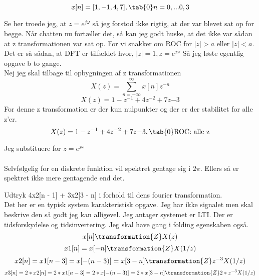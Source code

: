 \begin{rubrik}
\begin{eksamensOpgave}
    \end{eksamensOpgave}
    \clearpage
    \begin{eksamensOpgave}
        \[x[n] = [1, -1, 4, 7], \tab{0} n = 0, ...0, 3\]
        \begin{UnderOpgave}
            \color{teal}Se her troede jeg, at $z = e^{j\omega}$ så jeg forstod ikke rigtig, at der var blevet sat op for begge.
            Når chatten nu fortæller det, så kan jeg godt huske, at det ikke var sådan at z transformationen var sat op. 
            For vi snakker om ROC for $|z| > a$ eller $|z| < a$. Det er så sådan, at DFT er tilfældet hvor, $|z| = 1, z = e^{j\omega}$
            Så jeg løste egentlig opgave b to gange. \\
            Nej jeg skal tilbage til opbygningen af z transformationen\color{black}
            \[X(z)=\sum_{n=-\infty}^{\infty}x[n]z^{-n}\]
            \[X(z) = 1 - z^{-1} + 4z^{-2} + 7z{-3}\]
            For denne z transformation er der kun nulpunkter og der er der stabilitet for alle z'er.\\
            \[X(z) = 1 - z^{-1} + 4z^{-2} + 7z{-3}, \tab{0} \text{ROC: alle z}\]
        \end{UnderOpgave} 
        \begin{UnderOpgave}            
            Jeg substituere for $z = e^{j\omega}$ 
            \\\\
            Selvfølgelig for en diskrete funktion vil spektret gentage sig i $2\pi$. Ellers så er spektret ikke mere gentagende end det.
        \end{UnderOpgave}
        \begin{UnderOpgave}
            Udtryk 4x2[n - 1] + 3x2[3 - n] i forhold til dens fourier transformation. \\
            Det her er en typisk system karakteristisk opgave. Jeg har ikke signalet men skal beskrive den så godt jeg kan alligevel.
            Jeg antager systemet er LTI. Der er tidsforskydelse og tidsinvertering.
            Jeg skal have gang i folding egenskaben også. 
            \[x[n] \transformation{Z} X(z)\]
            \[x1[n] = x[-n] \transformation{Z} X(1/z)\]
            \[x2[n] = x1[n - 3] = x[-(n - 3)] = x[3 - n] \transformation{Z} z^{-3}X(1/z)\]
            \[x3[n] = 2 * x2[n] = 2 * x1[n - 3] = 2 * x[-(n - 3)] = 2 * x[3 - n] \transformation{Z} 2 * z^{-3}X(1/z)\]

\end{UnderOpgave}
\end{eksamensOpgave}
\end{rubrik}
